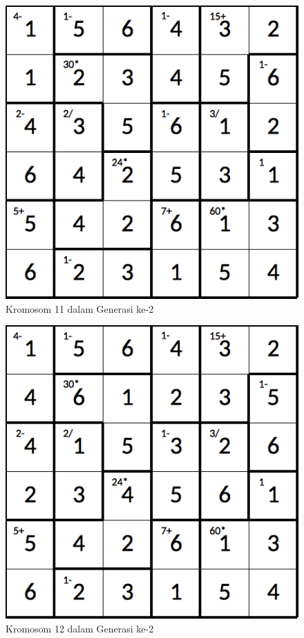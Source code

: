 \begin{figure}
\centering
\captionsetup{justification=centering}
\includegraphics[scale=0.333]{Gambar/hybridgenetic/Generation2Chromosome11}
\caption[Kromosom 11 dalam Generasi ke-2]{Kromosom 11 dalam Generasi ke-2}
\label{fig:analisisg2k11}
\end{figure}

\begin{figure}
\centering
\captionsetup{justification=centering}
\includegraphics[scale=0.333]{Gambar/hybridgenetic/Generation2Chromosome12}
\caption[Kromosom 12 dalam Generasi ke-2]{Kromosom 12 dalam Generasi ke-2}
\label{fig:analisisg2k12}
\end{figure}

